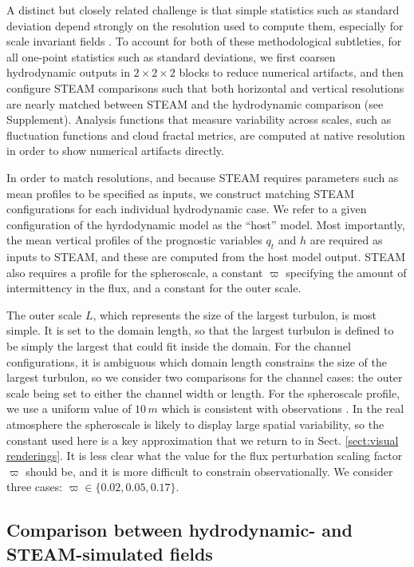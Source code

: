 \documentclass[acp, manuscript, english]{copernicus}
\begin{document}
A distinct but closely related challenge is that simple statistics such as standard deviation depend strongly on the resolution used to compute them, especially for scale invariant fields \citep{lovejoy2013}. To account for both of these methodological subtleties, for all one-point statistics such as standard deviations, we first coarsen hydrodynamic outputs in $2\times 2\times 2$ blocks to reduce numerical artifacts, and then configure STEAM comparisons such that both horizontal and vertical resolutions are nearly matched between STEAM and the hydrodynamic comparison (see Supplement). Analysis functions that measure variability across scales, such as fluctuation functions and cloud fractal metrics, are computed at native resolution in order to show numerical artifacts directly.

In order to match resolutions, and because STEAM requires parameters such as mean profiles to be specified as inputs, we construct matching STEAM configurations for each individual hydrodynamic case. We refer to a given configuration of the hyrdodynamic model as the ``host'' model. Most importantly, the mean vertical profiles of the prognostic variables $q_t$ and $h$ are required as inputs to STEAM, and these are computed from the host model output. STEAM also requires a profile for the spheroscale, a constant $\varpi$ specifying the amount of intermittency in the flux, and a constant for the outer scale. 

The outer scale $L$, which represents the size of the largest turbulon, is most simple. It is set to the domain length, so that the largest turbulon is defined to be simply the largest that could fit inside the domain. For the channel configurations, it is ambiguous which domain length constrains the size of the largest turbulon, so we consider two comparisons for the channel cases: the outer scale being set to either the channel width or length. For the spheroscale profile, we use a uniform value of $10\,\unit{m}$ which is consistent with observations \citep{dewitt2025preprint}. In the real atmosphere the spheroscale is likely to display large spatial variability, so the constant used here is a key approximation that we return to in Sect. \ref{sect:visual renderings}. It is less clear what the value for the flux perturbation scaling factor $\varpi$ should be, and it is more difficult to constrain observationally. We consider three cases: $\varpi\in\{0.02, 0.05, 0.17\}$.



\subsection{Comparison between hydrodynamic- and STEAM-simulated fields} \label{sect:field comparison}
\end{document}
